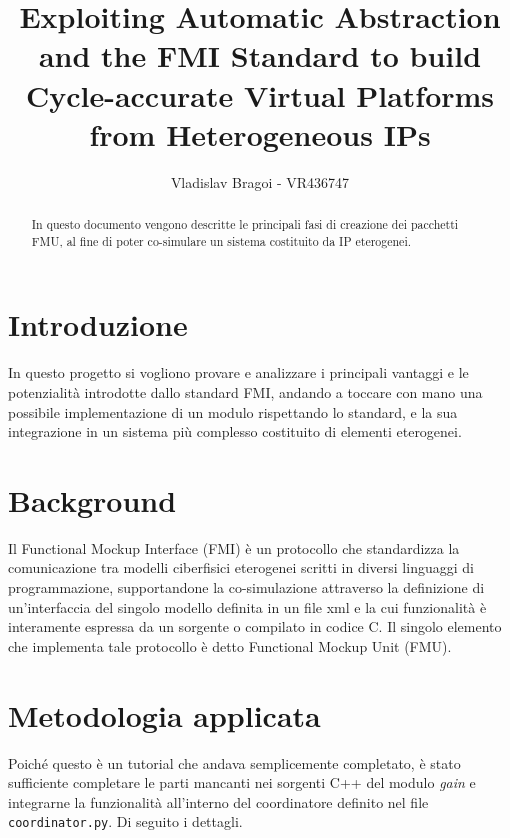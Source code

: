 \documentclass[]{IEEEtran}
\title{Exploiting Automatic Abstraction and the FMI Standard to build Cycle-accurate Virtual Platforms from 
Heterogeneous IPs}
\author{Vladislav Bragoi - VR436747}
\newcommand{\code}[1]{\texttt{#1}}
\begin{document}
\maketitle

\begin{abstract}
In questo documento vengono descritte le principali fasi di creazione dei pacchetti FMU, al fine di poter co-simulare un 
sistema costituito da IP eterogenei.

\end{abstract}

\section{Introduzione}
In questo progetto si vogliono provare e analizzare i principali vantaggi e le potenzialit\`a introdotte dallo standard
FMI, andando a toccare con mano una possibile implementazione di un modulo rispettando lo standard, e la sua integrazione 
in un sistema pi\`u complesso costituito di elementi eterogenei. 

\section{Background}
Il Functional Mockup Interface (FMI)\cite{FMI} è un protocollo che standardizza la comunicazione tra modelli ciberfisici 
eterogenei scritti in diversi linguaggi di programmazione, supportandone la co-simulazione attraverso la definizione di
un'interfaccia del singolo modello definita in un file xml e la cui funzionalit\`a \`e interamente espressa da un 
sorgente o compilato in codice C.
Il singolo elemento che implementa tale protocollo è detto Functional Mockup Unit (FMU).

\section{Metodologia applicata}
Poich\'e questo \`e un tutorial che andava semplicemente completato, \`e stato sufficiente completare le parti mancanti 
nei sorgenti C++ del modulo \emph{gain} e integrarne la funzionalit\`a all'interno del coordinatore definito nel file 
\code{coordinator.py}.
Di seguito i dettagli.
\end{document}

